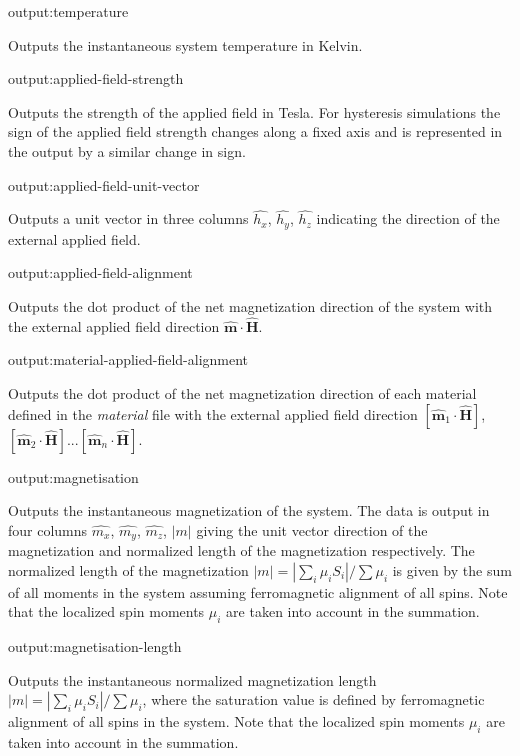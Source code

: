{\zicf output:temperature} Outputs the instantaneous system temperature in Kelvin.

{\zicf output:applied-field-strength} Outputs the strength of the applied field in Tesla. For hysteresis simulations the sign of the applied field strength changes along a fixed axis and is represented in the output by a similar change in sign.

{\zicf output:applied-field-unit-vector} Outputs a unit vector in three columns $\hat{h_x}$, $\hat{h_y}$, $\hat{h_z}$ indicating the direction of the external applied field.

{\zicf output:applied-field-alignment} Outputs the dot product of the net magnetization direction of the system with the external applied field direction $\hat{\mathbf{m}} \cdot \hat{\mathbf{H}}$.

{\zicf output:material-applied-field-alignment} Outputs the dot product of the net magnetization direction of each material defined in the \textit{material} file with the external applied field direction $\left[\hat{\mathbf{m}}_1 \cdot \hat{\mathbf{H}}\right]$, $\left[\hat{\mathbf{m}}_2 \cdot \hat{\mathbf{H}}\right]$...$\left[\hat{\mathbf{m}}_n \cdot \hat{\mathbf{H}}\right]$.

{\zicf output:magnetisation} Outputs the instantaneous magnetization of the system. The data is output in four columns $\hat{m_x}$, $\hat{m_y}$, $\hat{m_z}$, $|m|$ giving the unit vector direction of the magnetization and
normalized length of the magnetization respectively. The normalized length of the magnetization $|m| = |\sum_i \mu_i S_i| / \sum \mu_i$ is given by the sum of all moments in the system assuming ferromagnetic alignment of all spins. Note that the localized spin moments $\mu_i$ are taken into account in the summation.

{\zicf output:magnetisation-length} Outputs the instantaneous normalized magnetization length $|m| = |\sum_i \mu_i S_i| / \sum \mu_i$, where the saturation value is defined by ferromagnetic alignment of all spins in the system. Note that the localized spin moments $\mu_i$ are taken into account in the summation.

